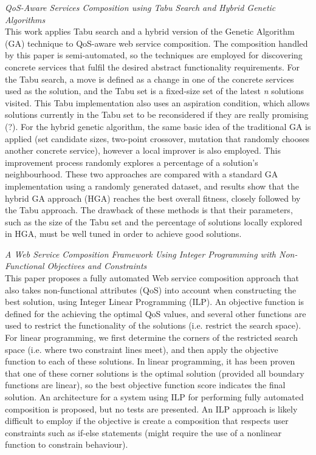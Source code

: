 \textit{QoS-Aware Services Composition using Tabu Search and Hybrid Genetic Algorithms \cite{parejo2008qos}}\\
This work applies Tabu search and a hybrid version of the Genetic Algorithm (GA) technique to QoS-aware web service composition. The composition handled by
this paper is semi-automated, so the techniques are employed for discovering concrete services that fulfil the desired abstract functionality requirements.
For the Tabu search, a move is defined as a change in one of the concrete services used as the solution, and the Tabu set is a fixed-size set of the latest
\textit{n} solutions visited. This Tabu implementation also uses an aspiration condition, which allows solutions currently in the Tabu set to be reconsidered
if they are really promising (?). For the hybrid genetic algorithm, the same basic idea of the traditional GA is applied (set candidate sizes, two-point crossover,
mutation that randomly chooses another concrete service), however a local improver is also employed. This improvement process randomly explores a percentage of
a solution's neighbourhood. These two approaches are compared with a standard GA implementation using a randomly generated dataset, and results show that the hybrid
GA approach (HGA) reaches the best overall fitness, closely followed by the Tabu approach. The drawback of these methods is that their parameters, such as the size
of the Tabu set and the percentage of solutions locally explored in HGA, must be well tuned in order to achieve good solutions.

\textit{A Web Service Composition Framework Using Integer Programming with Non-Functional Objectives and Constraints \cite{yoo2008web}}\\
This paper proposes a fully automated Web service composition approach that also takes non-functional attributes (QoS) into account when constructing the
best solution, using Integer Linear Programming (ILP). An objective function is defined for the achieving the optimal QoS values, and several other functions
are used to restrict the functionality of the solutions (i.e. restrict the search space). For linear programming, we first determine the corners of the
restricted search space (i.e. where two constraint lines meet), and then apply the objective function to each of these solutions. In linear programming, it
has been proven that one of these corner solutions is the optimal solution (provided all boundary functions are linear), so the best objective function score
indicates the final solution. An architecture for a system using ILP for performing fully automated composition is proposed, but no tests are presented.
An ILP approach is likely difficult to employ if the objective is create a composition that respects user constraints such as if-else statements (might require
the use of a nonlinear function to constrain behaviour).

